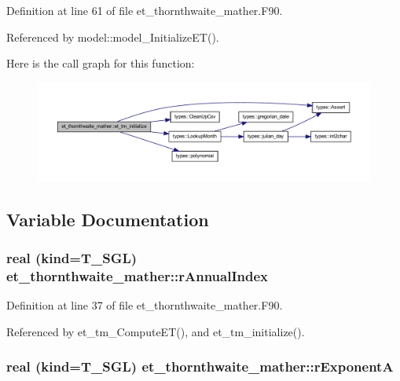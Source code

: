 Definition at line 61 of file et\_\-thornthwaite\_\-mather.F90.



Referenced by model::model\_\-InitializeET().



Here is the call graph for this function:\nopagebreak
\begin{figure}[H]
\begin{center}
\leavevmode
\includegraphics[width=400pt]{namespaceet__thornthwaite__mather_ad8d9ce7fc2d1f78f064d52577e1ff7a8_cgraph}
\end{center}
\end{figure}




\subsection{Variable Documentation}
\hypertarget{namespaceet__thornthwaite__mather_aafcf8b496955f8fa02d8fcf420b60302}{
\subsubsection[{rAnnualIndex}]{\setlength{\rightskip}{0pt plus 5cm}real (kind=T\_\-SGL) {\bf et\_\-thornthwaite\_\-mather::rAnnualIndex}}}
\label{namespaceet__thornthwaite__mather_aafcf8b496955f8fa02d8fcf420b60302}


Definition at line 37 of file et\_\-thornthwaite\_\-mather.F90.



Referenced by et\_\-tm\_\-ComputeET(), and et\_\-tm\_\-initialize().

\hypertarget{namespaceet__thornthwaite__mather_a9dd015bf8736b5aca8e3e0c29b39335a}{
\subsubsection[{rExponentA}]{\setlength{\rightskip}{0pt plus 5cm}real (kind=T\_\-SGL) {\bf et\_\-thornthwaite\_\-mather::rExponentA}}}
\label{namespaceet__thornthwaite__mather_a9dd015bf8736b5aca8e3e0c29b39335a}



